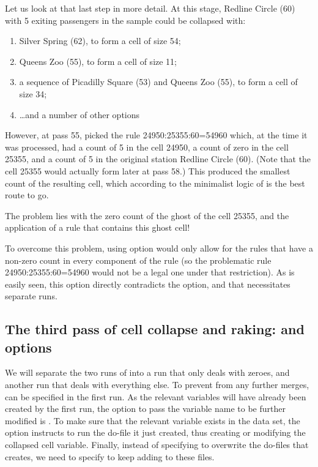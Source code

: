 Let us look at that last step in more detail. At this stage, Redline Circle (60) with 5 exiting passengers in
the sample could be collapsed with:
\begin{enumerate}
    \item Silver Spring (62), to form a cell of size 54;
    \item Queens Zoo (55), to form a cell of size 11;
    \item a sequence of Picadilly Square (53) and Queens Zoo (55), to form a cell of size 34;
    \item \ldots and a number of other options
\end{enumerate}

However, at pass 55,  picked the rule 24950:25355:60=54960 which, at the time it was
processed, had a count of 5 in the cell 24950, a count of zero in the cell 25355, and a count of 5 in the
original station Redline Circle (60). (Note that the cell 25355 would actually form later at pass 58.) 
This produced the smallest count of the resulting cell, which according to the minimalist logic 
of  is the best route to go. 

The problem lies with the zero count of the ghost of the cell 25355, and the application of a rule
that contains this ghost cell!

To overcome this problem,  using  option would only allow for the rules
that have a non-zero count in every component of the rule (so the problematic rule
24950:25355:60=54960 would not be a legal one under that restriction). As is easily seen,
this option directly contradicts the  option, and that necessitates separate runs.

\subsection{The third pass of cell collapse and raking:  and  options}

We will separate the two runs of  into a run that only deals with zeroes,
and another run that deals with everything else. To prevent  from any further
merges,  can be specified in the first run. As the relevant variables will have already been
created by the first run, the option to pass the variable name to be further modified is
. To make sure that the relevant variable exists in the data set,
the option  instructs  to run the do-file it just created,
thus creating or modifying the collapsed cell variable.
Finally, instead of specifying  to overwrite the do-files that
 creates, we need to specify  to keep adding to these files.


